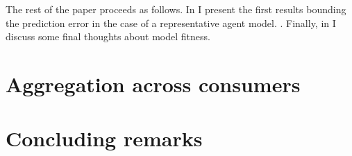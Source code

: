 \documentclass[english, a4paper,12pt]{article}
\begin{document}
The rest of the paper proceeds as follows. In  I present the first results bounding the prediction error in the case of a representative agent model. . Finally, in  I discuss some final thoughts about model fitness.

\section{Aggregation across consumers} \label{sec:repagent}


\section{Concluding remarks} \label{sec:conclusion}



\end{document}
